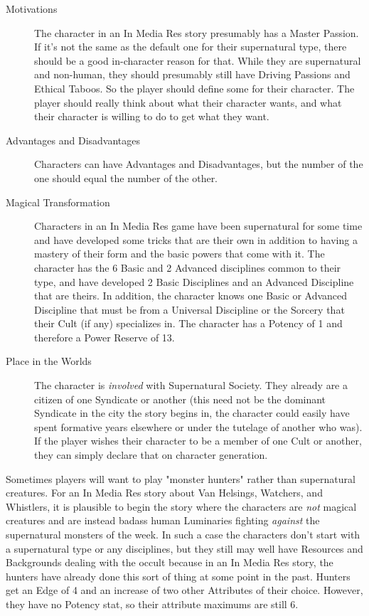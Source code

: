 \begin{description}
\item[Motivations]
The character in an In Media Res story presumably has a Master Passion. If it's not the same as the default one for their supernatural type, there should be a good in-character reason for that. While they are supernatural and non-human, they should presumably still have Driving Passions and Ethical Taboos. So the player should define some for their character. The player should really think about what their character wants, and what their character is willing to do to get what they want.

\item[Advantages and Disadvantages]
Characters can have Advantages and Disadvantages, but the number of the one should equal the number of the other.

\item[Magical Transformation]
Characters in an In Media Res game have been supernatural for some time and have developed some tricks that are their own in addition to having a mastery of their form and the basic powers that come with it. The character has the 6 Basic and 2 Advanced disciplines common to their type, and have developed 2 Basic Disciplines and an Advanced Discipline that are theirs. In addition, the character knows one Basic or Advanced Discipline that must be from a Universal Discipline or the Sorcery that their Cult (if any) specializes in. The character has a Potency of 1 and therefore a Power Reserve of 13.

\item[Place in the Worlds]
The character is \textit{involved} with Supernatural Society. They already are a citizen of one Syndicate or another (this need not be the dominant Syndicate in the city the story begins in, the character could easily have spent formative years elsewhere or under the tutelage of another who was). If the player wishes their character to be a member of one Cult or another, they can simply declare that on character generation.
\end{description}

Sometimes players will want to play "monster hunters" rather than supernatural creatures. For an In Media Res story about Van Helsings, Watchers, and Whistlers, it is plausible to begin the story where the characters are \textit{not} magical creatures and are instead badass human Luminaries fighting \textit{against} the supernatural monsters of the week. In such a case the characters don't start with a supernatural type or any disciplines, but they still may well have Resources and Backgrounds dealing with the occult because in an In Media Res story, the hunters have already done this sort of thing at some point in the past. Hunters get an Edge of 4 and an increase of two other Attributes of their choice. However, they have no Potency stat, so their attribute maximums are still 6.

